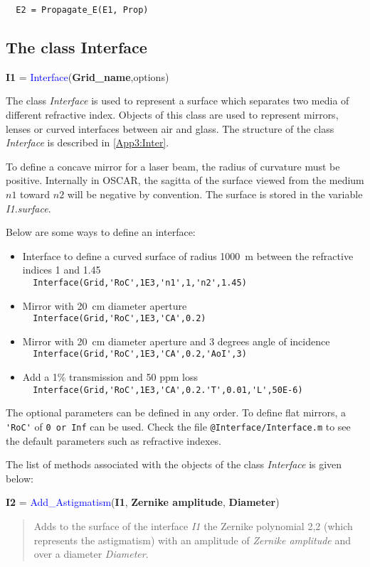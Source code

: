 \verb?  E2 = Propagate_E(E1, Prop) ?

\subsection{The class Interface}
\textbf{I1} = \textcolor{blue}{Interface}(\textbf{Grid\_name},options)

The class \textsl{Interface} is used to represent a surface which separates two media of different refractive index. Objects of this class are used to represent mirrors, lenses or curved interfaces between air and glass. The structure of the class \textsl{Interface} is described in \ref{App3:Inter}.

To define a concave mirror for a laser beam, the radius of curvature must be positive. Internally in OSCAR, the sagitta of the surface viewed from the medium $n1$ toward $n2$ will be negative by convention. The surface is stored in the variable \textsl{I1.surface}.

Below are some ways to define an interface:
\begin{itemize}
  \item Interface to define a curved surface of radius 1000~m between the refractive indices 1 and 1.45 \\
        \verb?  Interface(Grid,'RoC',1E3,'n1',1,'n2',1.45) ?
  \item Mirror with 20~cm diameter aperture\\
      \verb?  Interface(Grid,'RoC',1E3,'CA',0.2) ?
   \item Mirror with 20~cm diameter aperture and 3 degrees angle of incidence \\
      \verb?  Interface(Grid,'RoC',1E3,'CA',0.2,'AoI',3) ?
  \item Add a 1\% transmission and 50 ppm loss\\
        \verb?  Interface(Grid,'RoC',1E3,'CA',0.2.'T',0.01,'L',50E-6) ?
\end{itemize}
The optional parameters can be defined in any order. To define flat mirrors, a \verb?'RoC'? of \verb?0 or Inf? can be used. Check the file \verb?@Interface/Interface.m? to see the default parameters such as refractive indexes.

The list of methods associated with the objects of the class \textsl{Interface} is given below:

\noindent \textbf{I2} = \textcolor{blue}{Add\_Astigmatism}(\textbf{I1}, \textbf{Zernike amplitude}, \textbf{Diameter})
\vspace*{-0.2cm}
\begin{quote}
Adds to the surface of the interface \textsl{I1} the Zernike polynomial 2,2 (which represents the astigmatism) with an amplitude of \textsl{Zernike amplitude} and over a diameter \textsl{Diameter}.
\end{quote}


